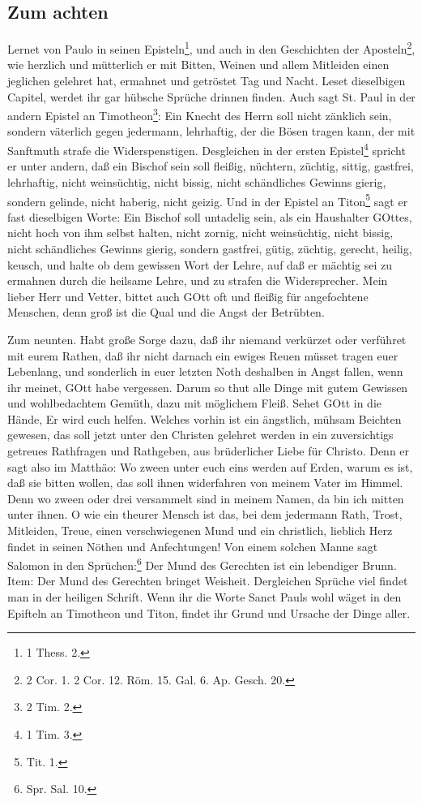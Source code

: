 \subsection{Zum achten}

Lernet von Paulo in seinen Episteln\footnote{1 Thess. 2.}, und auch in den Geschichten der Aposteln\footnote{2 Cor. 1. 2 Cor. 12. Röm. 15. Gal. 6. Ap. Gesch. 20.}, wie herzlich und mütterlich er mit Bitten, Weinen und allem Mitleiden einen jeglichen gelehret hat, ermahnet und getröstet Tag und Nacht. Leset dieselbigen Capitel, werdet ihr gar hübsche Sprüche drinnen finden. Auch sagt St. Paul in der andern Epistel an Timotheon\footnote{2 Tim. 2.}: Ein Knecht des Herrn soll nicht zänklich sein, sondern väterlich gegen jedermann,
lehrhaftig, der die Bösen tragen kann, der mit Sanftmuth strafe die Widerspenstigen. Desgleichen in der ersten Epistel\footnote{1 Tim. 3.} spricht er unter andern, daß ein Bischof sein soll fleißig, nüchtern, züchtig, sittig, gastfrei, lehrhaftig, nicht weinsüchtig, nicht bissig, nicht schändliches Gewinns gierig, sondern gelinde, nicht haberig, nicht geizig. Und in der Epistel an Titon\footnote{Tit. 1.} sagt er fast dieselbigen Worte: Ein Bischof soll untadelig sein, als ein Haushalter GOttes, nicht hoch von ihm selbst halten, nicht zornig, nicht weinsüchtig, nicht bissig, nicht schändliches Gewinns gierig, sondern gastfrei, gütig, züchtig, gerecht, heilig, keusch, und halte ob dem gewissen Wort der Lehre, auf daß er mächtig sei zu ermahnen durch die heilsame Lehre, und zu strafen die Widersprecher. Mein lieber Herr und Vetter, bittet auch GOtt oft und fleißig für angefochtene Menschen, denn groß ist die Qual und die Angst der Betrübten.

Zum neunten. Habt große Sorge dazu, daß ihr niemand verkürzet oder verführet mit eurem Rathen, daß ihr nicht darnach ein ewiges Reuen müsset tragen euer Lebenlang, und sonderlich in euer letzten Noth deshalben in Angst fallen, wenn ihr meinet, GOtt habe vergessen. Darum so thut alle Dinge mit gutem Gewissen und wohlbedachtem Gemüth, dazu mit möglichem Fleiß. Sehet GOtt in die Hände, Er wird euch helfen. Welches vorhin ist ein ängstlich, mühsam Beichten gewesen, das soll jetzt unter den Christen gelehret werden in ein zuversichtigs getreues Rathfragen und Rathgeben, aus brüderlicher Liebe für Christo. Denn er sagt also im Matthäo: Wo zween unter euch eins werden auf Erden, warum es ist, daß sie bitten wollen, das soll ihnen widerfahren von meinem Vater im Himmel. Denn wo zween oder drei versammelt sind in meinem
Namen, da bin ich mitten unter ihnen. O wie ein theurer Mensch ist das, bei dem jedermann Rath, Trost, Mitleiden, Treue, einen verschwiegenen Mund und ein christlich, lieblich Herz findet in seinen Nöthen und Anfechtungen! Von einem solchen Manne sagt Salomon in den Sprüchen:\footnote{Spr. Sal. 10.} Der Mund des Gerechten ist ein lebendiger Brunn. Item: Der Mund des Gerechten bringet Weisheit. Dergleichen Sprüche viel findet man in der heiligen Schrift. Wenn ihr die Worte Sanct Pauls wohl wäget in den Epifteln an Timotheon und Titon, findet ihr Grund und Ursache der Dinge aller.

